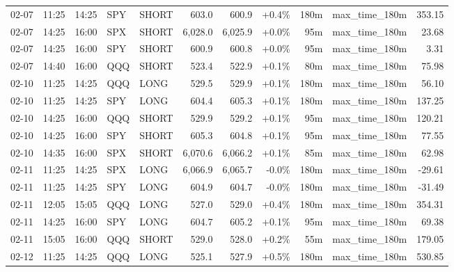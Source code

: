 \documentclass[11pt,a4paper,twoside]{article}
\begin{document}
\begin{center}
\begin{longtable}{>{\color{txtmain}}l l l l l r r r r >{\color{txtmain}}l r}
02-07 & 11:25 & 14:25 & SPY & SHORT & 603.0 & 600.9 & \textcolor{wingreen}{+0.4\%} & 180m & max\_time\_180m & \textcolor{wingreen}{353.15} \\
02-07 & 14:25 & 16:00 & SPX & SHORT & 6,028.0 & 6,025.9 & \textcolor{wingreen}{+0.0\%} & 95m & max\_time\_180m & \textcolor{wingreen}{23.68} \\
02-07 & 14:25 & 16:00 & SPY & SHORT & 600.9 & 600.8 & \textcolor{wingreen}{+0.0\%} & 95m & max\_time\_180m & \textcolor{wingreen}{3.31} \\
02-07 & 14:40 & 16:00 & QQQ & SHORT & 523.4 & 522.9 & \textcolor{wingreen}{+0.1\%} & 80m & max\_time\_180m & \textcolor{wingreen}{75.98} \\
02-10 & 11:25 & 14:25 & QQQ & LONG & 529.5 & 529.9 & \textcolor{wingreen}{+0.1\%} & 180m & max\_time\_180m & \textcolor{wingreen}{56.10} \\
02-10 & 11:25 & 14:25 & SPY & LONG & 604.4 & 605.3 & \textcolor{wingreen}{+0.1\%} & 180m & max\_time\_180m & \textcolor{wingreen}{137.25} \\
02-10 & 14:25 & 16:00 & QQQ & SHORT & 529.9 & 529.2 & \textcolor{wingreen}{+0.1\%} & 95m & max\_time\_180m & \textcolor{wingreen}{120.21} \\
02-10 & 14:25 & 16:00 & SPY & SHORT & 605.3 & 604.8 & \textcolor{wingreen}{+0.1\%} & 95m & max\_time\_180m & \textcolor{wingreen}{77.55} \\
02-10 & 14:35 & 16:00 & SPX & SHORT & 6,070.6 & 6,066.2 & \textcolor{wingreen}{+0.1\%} & 85m & max\_time\_180m & \textcolor{wingreen}{62.98} \\
02-11 & 11:25 & 14:25 & SPX & LONG & 6,066.9 & 6,065.7 & \textcolor{lossred}{-0.0\%} & 180m & max\_time\_180m & \textcolor{lossred}{-29.61} \\
02-11 & 11:25 & 14:25 & SPY & LONG & 604.9 & 604.7 & \textcolor{lossred}{-0.0\%} & 180m & max\_time\_180m & \textcolor{lossred}{-31.49} \\
02-11 & 12:05 & 15:05 & QQQ & LONG & 527.0 & 529.0 & \textcolor{wingreen}{+0.4\%} & 180m & max\_time\_180m & \textcolor{wingreen}{354.31} \\
02-11 & 14:25 & 16:00 & SPY & LONG & 604.7 & 605.2 & \textcolor{wingreen}{+0.1\%} & 95m & max\_time\_180m & \textcolor{wingreen}{69.38} \\
02-11 & 15:05 & 16:00 & QQQ & SHORT & 529.0 & 528.0 & \textcolor{wingreen}{+0.2\%} & 55m & max\_time\_180m & \textcolor{wingreen}{179.05} \\
02-12 & 11:25 & 14:25 & QQQ & LONG & 525.1 & 527.9 & \textcolor{wingreen}{+0.5\%} & 180m & max\_time\_180m & \textcolor{wingreen}{530.85} \\

\end{longtable}
\end{center}
\end{document}
